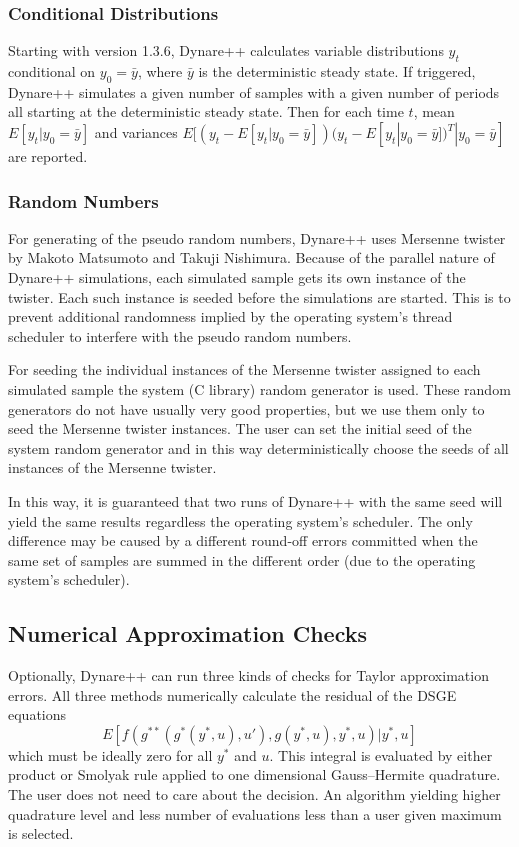 \documentclass[10pt]{article}
\begin{document}
\subsubsection{Conditional Distributions}
\label{cond_dist}

Starting with version 1.3.6, Dynare++ calculates variable
distributions $y_t$ conditional on $y_0=\bar y$, where $\bar y$ is the
deterministic steady state. If triggered, Dynare++ simulates a given
number of samples with a given number of periods all starting at
the deterministic steady state. Then for each time $t$, mean
$E[y_t|y_0=\bar y]$ and variances $E[(y_t-E[y_t|y_0=\bar
y])(y_t-E[y_t|y_0=\bar y])^T|y_0=\bar y]$ are reported.

\subsubsection{Random Numbers}
\label{random_numbers}

For generating of the pseudo random numbers, Dynare++ uses Mersenne
twister by Makoto Matsumoto and Takuji Nishimura. Because of the
parallel nature of Dynare++ simulations, each simulated sample gets
its own instance of the twister. Each such instance is seeded before
the simulations are started. This is to prevent additional randomness
implied by the operating system's thread scheduler to interfere with
the pseudo random numbers.

For seeding the individual instances of the Mersenne twister assigned
to each simulated sample the system (C library) random generator is
used. These random generators do not have usually very good
properties, but we use them only to seed the Mersenne twister
instances. The user can set the initial seed of the system random
generator and in this way deterministically choose the seeds of all
instances of the Mersenne twister.

In this way, it is guaranteed that two runs of Dynare++
with the same seed will yield the same results regardless the
operating system's scheduler. The only difference may be caused by a
different round-off errors committed when the same set of samples are
summed in the different order (due to the operating system's scheduler).

\subsection{Numerical Approximation Checks}
\label{checks}

Optionally, Dynare++ can run three kinds of checks for Taylor
approximation errors. All three methods numerically calculate
the residual of the DSGE equations
\[
E[f(g^{**}(g^*(y^*,u),u'),g(y^*,u),y^*,u)|y^*,u]
\]
which must be ideally zero for all $y^*$ and $u$. This integral is
evaluated by either product or Smolyak rule applied to one dimensional
Gauss--Hermite quadrature. The user does not need to care about the
decision. An algorithm yielding higher quadrature level and less
number of evaluations less than a user given maximum is selected.
\end{document}

